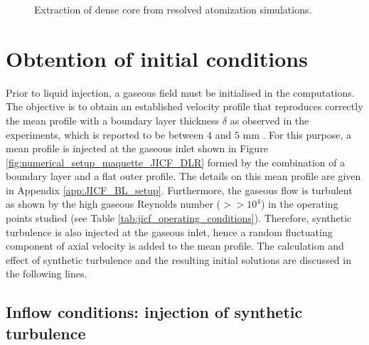 \begin{figure}[ht]
     \centering
     \caption{Extraction of dense core from resolved atomization simulations.}
      \label{fig:dense_core_extraction}
\end{figure}




\section{Obtention of initial conditions}
\label{sec:ch5_initial_conditions}

Prior to liquid injection, a gaseous field must be initialised in the computations. The objective is to obtain an established velocity profile that reproduces correctly the mean profile with a boundary layer thickness $\delta$ as observed in the experiments, which is reported to be between $4$ and $5$ mm . For this purpose, a mean profile is injected at the gaseous inlet shown in Figure \ref{fig:numerical_setup_maquette_JICF_DLR} formed by the combination of a boundary layer and a flat outer profile. The details on this mean profile are given in Appendix \ref{app:JICF_BL_setup}. Furthermore, the gaseous flow is turbulent as shown by the high gaseous Reynolds number ($>> 10^4$) in the operating points studied (see Table \ref{tab:jicf_operating_conditions}). Therefore, synthetic turbulence is also injected at the gaseous inlet, hence a random fluctuating component of axial velocity is added to the mean profile. The calculation and effect of synthetic turbulence and the resulting initial solutions are discussed in the following lines.


\subsection{Inflow conditions: injection of synthetic turbulence}


